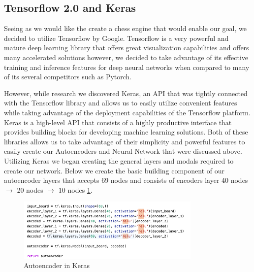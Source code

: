 \documentclass[12pt]{article}
\begin{document}
    \subsection{Tensorflow 2.0 and Keras}

    Seeing as we would like the create a chess engine that would enable our goal, we decided to utilize Tensorflow by Google. Tensorflow is a very powerful and mature deep learning library that offers great visualization capabilities and offers many accelerated solutions however, we decided to take advantage of its effective training and inference features for deep neural networks when compared to many of its several competitors such as Pytorch. 

    However, while research we discovered Keras, an API that was tightly connected with the Tensorflow library and allows us to easily utilize convenient features while taking advantage of the deployment capabilities of the Tensorflow platform. Keras is a high-level API that consists of a highly productive interface that provides building blocks for developing machine learning solutions. Both of these libraries allows us to take advantage of their simplicity and powerful features to easily create our Autoencoders and Neural Network that were discussed above. Utilizing Keras we began creating the general layers and modals required to create our network. Below we create the basic building component of our autoencoder layers that accepts 69 nodes and consists of encoders layer 40 nodes $\rightarrow$ 20 nodes $\rightarrow$ 10 nodes \ref{fig:autoencoder}.

    \begin{singlespace}
        \begin{figure}[ht]
            \centering
            \caption{Autoencoder in Keras}
            \label{fig:autoencoder}
            \includegraphics[width=0.8\textwidth]{autoencoder.png}
        \end{figure}
    \end{singlespace}
\end{document}
